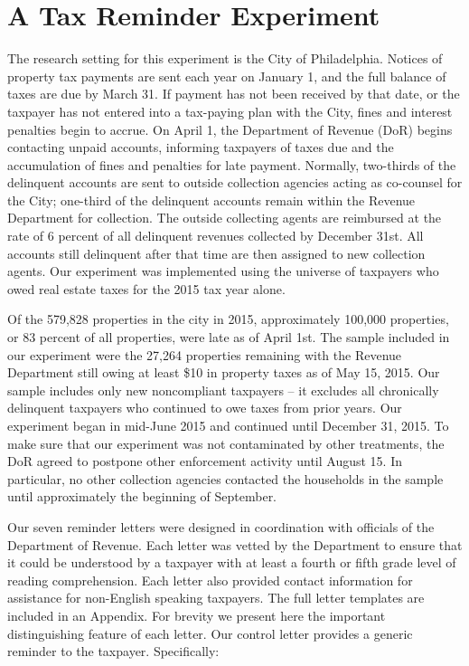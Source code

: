 \documentclass[12pt]{article}
\begin{document}
  
\section{ A Tax Reminder Experiment}
 

The research setting for this experiment is the City of Philadelphia.
Notices of property tax payments are sent each year on January 1, and
the full balance of taxes are due by March 31.  If payment has not
been received by that date, or the taxpayer has not entered into a
tax-paying plan with the City, fines and interest penalties begin to
accrue.  On April 1, the Department of Revenue (DoR) begins contacting
unpaid accounts, informing taxpayers of taxes due and the accumulation
of fines and penalties for late payment.  Normally, two-thirds of the
delinquent accounts are sent to outside collection agencies acting as
co-counsel for the City; one-third of the delinquent accounts remain
within the Revenue Department for collection.  The outside collecting
agents are reimbursed at the rate of 6 percent of all delinquent
revenues collected by December 31st.  All accounts still delinquent
after that time are then assigned to new collection agents.  Our
experiment was implemented using the universe of taxpayers who owed real
estate taxes for the 2015 tax year alone.
  
Of the 579,828 properties in the city in 2015, approximately 100,000
properties, or 83 percent of all properties, were late as of
April 1st.  The sample included in our experiment were the 27,264
properties remaining with the Revenue Department still owing at
least \$10 in property taxes as of May 15, 2015.  Our sample includes
only new noncompliant taxpayers -- it excludes all chronically delinquent
taxpayers who continued to owe taxes from prior years.  Our experiment began in
mid-June 2015 and continued until December 31, 2015.  To make sure
that our experiment was not contaminated by other treatments, the DoR
agreed to postpone other enforcement activity until August 15. In
particular, no other collection agencies contacted the households in
the sample until approximately the beginning of September.

Our seven reminder letters were designed in coordination with
officials of the Department of Revenue.  Each letter was vetted by the
Department to ensure that it could be understood by a taxpayer with at
least a fourth or fifth grade level of reading comprehension.  Each
letter also provided contact information for assistance for
non-English speaking taxpayers.  The full letter templates are
included in an Appendix.  For brevity we present here the important distinguishing
feature of each letter.  Our control letter provides a generic
reminder to the taxpayer. Specifically:
 
\end{document}
